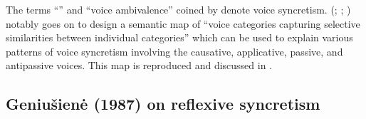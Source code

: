 The terms “” and “voice ambivalence” coined by \citeauthor{malchukov:2015} denote voice syncretism. \citeauthor{malchukov:2015} (\citeyear[123]{malchukov:2015}; \citeyear[414]{malchukov:2016}; \citeyear[24]{malchukov:2017}) notably goes on to design a semantic map of “voice categories capturing selective similarities between individual categories” which can be used to explain various patterns of voice syncretism involving the causative, applicative, passive, and antipassive voices. This map is reproduced and discussed in .

\subsection{Geniušienė (1987) on reflexive syncretism} \label{geniusiene-syncretism}
